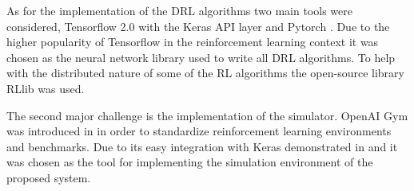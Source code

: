 As for the implementation of the \acrshort{DRL} algorithms two main tools were considered, Tensorflow 2.0 \cite{tensorflow} with the Keras API layer and Pytorch \cite{pytorch}. Due to the higher popularity of Tensorflow in the reinforcement learning context it was chosen as the neural network library used to write all DRL algorithms. To help with the distributed nature of some of the \acrshort{RL} algorithms the open-source library RLlib \cite{rllib} was used.

The second major challenge is the implementation of the simulator. OpenAI Gym was introduced in \cite{opengym} in order to standardize reinforcement learning environments and benchmarks. Due to its easy integration with Keras demonstrated in \cite{kerasrl} and \cite{kerasrl2} it was chosen as the tool for implementing the simulation environment of the proposed system.
